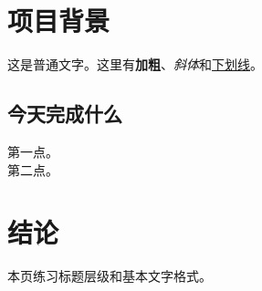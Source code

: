 \documentclass[12pt,a4paper]{ctexart} %
\begin{document}
\section{项目背景} %
这是普通文字。这里有\textbf{加粗}、\textit{斜体}和\underline{下划线}。 %

\subsection{今天完成什么} %
第一点。\\ %
第二点。

\section{结论}
本页练习标题层级和基本文字格式。
\end{document}
